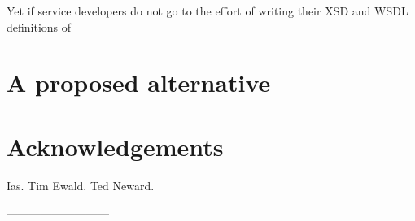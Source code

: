 \documentclass[draft]{paper}
\begin{document}
Yet if service developers do not go to the effort of writing their XSD and WSDL definitions
of 

\section{A proposed alternative}


\section{Acknowledgements}

Ias. Tim Ewald. Ted Neward.  


---------------------------







\onecolumn

%


\end{document}
